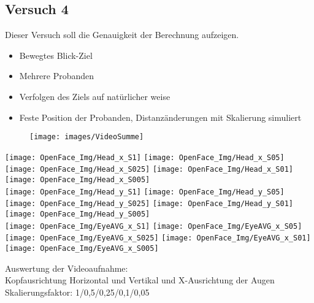 \subsection{Versuch 4}
\begin{frame}
Dieser Versuch soll die Genauigkeit der Berechnung aufzeigen.
\begin{itemize}
	\item<1-> Bewegtes Blick-Ziel
	\item<1-> Mehrere Probanden
	\item<1-> Verfolgen des Ziels auf natürlicher weise
	\item<1-> Feste Position der Probanden, Distanzänderungen mit Skalierung simuliert
\end{itemize}
\begin{figure}
	\centering
	\texttt{[image: images/VideoSumme]}
\end{figure}
\end{frame}
\begin{frame}
\begin{center}
\texttt{[image: OpenFace\_Img/Head\_x\_S1]}
\texttt{[image: OpenFace\_Img/Head\_x\_S05]}
\texttt{[image: OpenFace\_Img/Head\_x\_S025]}
\texttt{[image: OpenFace\_Img/Head\_x\_S01]}
\texttt{[image: OpenFace\_Img/Head\_x\_S005]}\\	
\texttt{[image: OpenFace\_Img/Head\_y\_S1]}
\texttt{[image: OpenFace\_Img/Head\_y\_S05]}
\texttt{[image: OpenFace\_Img/Head\_y\_S025]}
\texttt{[image: OpenFace\_Img/Head\_y\_S01]}
\texttt{[image: OpenFace\_Img/Head\_y\_S005]}\\	
\texttt{[image: OpenFace\_Img/EyeAVG\_x\_S1]}	
\texttt{[image: OpenFace\_Img/EyeAVG\_x\_S05]}
\texttt{[image: OpenFace\_Img/EyeAVG\_x\_S025]}
\texttt{[image: OpenFace\_Img/EyeAVG\_x\_S01]}
\texttt{[image: OpenFace\_Img/EyeAVG\_x\_S005]}
\end{center}
Auswertung der Videoaufnahme:\\
\footnotesize{
Kopfausrichtung Horizontal und Vertikal und X-Ausrichtung der Augen}
Skalierungsfaktor: 1/0,5/0,25/0,1/0,05
\end{frame}